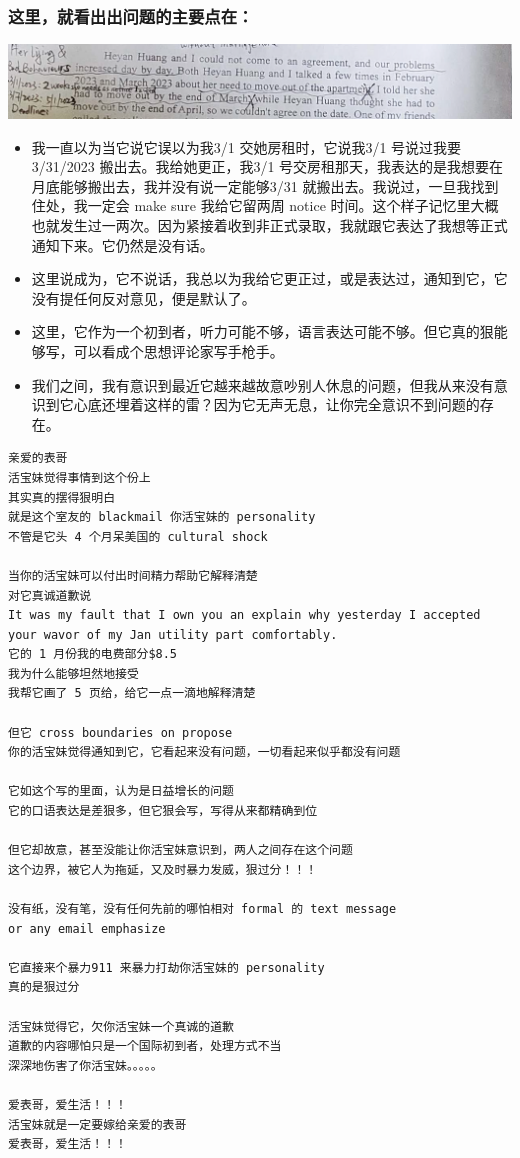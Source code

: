 \documentclass[9pt, b5paper]{article}
\begin{document}
\subsubsection{这里，就看出出问题的主要点在：}
\label{sec-6-3-1}

\includegraphics[width=.9\linewidth]{./pic/readme2_20230330_164636.png}
\begin{itemize}
\item 我一直以为当它说它误以为我3/1 交她房租时，它说我3/1 号说过我要 3/31/2023 搬出去。我给她更正，我3/1 号交房租那天，我表达的是我想要在月底能够搬出去，我并没有说一定能够3/31 就搬出去。我说过，一旦我找到住处，我一定会 make sure 我给它留两周 notice 时间。这个样子记忆里大概也就发生过一两次。因为紧接着收到非正式录取，我就跟它表达了我想等正式通知下来。它仍然是没有话。
\item 这里说成为，它不说话，我总以为我给它更正过，或是表达过，通知到它，它没有提任何反对意见，便是默认了。
\item 这里，它作为一个初到者，听力可能不够，语言表达可能不够。但它真的狠能够写，可以看成个思想评论家写手枪手。
\item 我们之间，我有意识到最近它越来越故意吵别人休息的问题，但我从来没有意识到它心底还埋着这样的雷？因为它无声无息，让你完全意识不到问题的存在。
\end{itemize}
\begin{verbatim}
亲爱的表哥
活宝妹觉得事情到这个份上
其实真的摆得狠明白
就是这个室友的 blackmail 你活宝妹的 personality
不管是它头 4 个月呆美国的 cultural shock

当你的活宝妹可以付出时间精力帮助它解释清楚
对它真诚道歉说
It was my fault that I own you an explain why yesterday I accepted your wavor of my Jan utility part comfortably.
它的 1 月份我的电费部分$8.5
我为什么能够坦然地接受
我帮它画了 5 页给，给它一点一滴地解释清楚

但它 cross boundaries on propose
你的活宝妹觉得通知到它，它看起来没有问题，一切看起来似乎都没有问题

它如这个写的里面，认为是日益增长的问题
它的口语表达是差狠多，但它狠会写，写得从来都精确到位

但它却故意，甚至没能让你活宝妹意识到，两人之间存在这个问题
这个边界，被它人为拖延，又及时暴力发威，狠过分！！！

没有纸，没有笔，没有任何先前的哪怕相对 formal 的 text message
or any email emphasize

它直接来个暴力911 来暴力打劫你活宝妹的 personality
真的是狠过分

活宝妹觉得它，欠你活宝妹一个真诚的道歉
道歉的内容哪怕只是一个国际初到者，处理方式不当
深深地伤害了你活宝妹。。。。。

爱表哥，爱生活！！！
活宝妹就是一定要嫁给亲爱的表哥
爱表哥，爱生活！！！
\end{verbatim}
\end{document}
